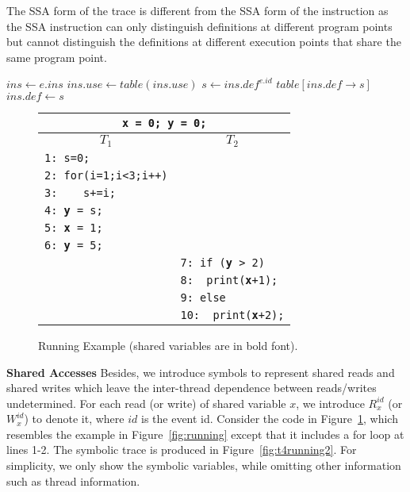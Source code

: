 The SSA form of the trace is different from the SSA form of the instruction as the SSA instruction can only distinguish definitions at different program points but cannot distinguish the definitions at different execution points that share the same program point.





\begin{algorithmic}[3]
 \State $ins\gets e.ins$ 
 \State $ins.use \gets table(ins.use)$
 \EndFor
    \State $ s\gets ins.def^{e.id}$
	\State $ table [ins.def \rightarrow s]$
	\State $ins.def\gets s$
 \EndIf
\EndFor
\end{algorithmic}


\begin{figure}
\centering
\begin{tabular}{ll}
\multicolumn{2}{c}{{\tt {\bf x} = 0; {\bf y} = 0;}} \\
\hline
\multicolumn{1}{c}{$T_1$} & \multicolumn{1}{c}{$T_2$} \\
\hline
{\tt 1: s=0; } & \\
{\tt 2: for(i=1;i<3;i++)} & \\
{\tt 3: \ \ \ s+=i;} & \\
{\tt 4: {\bf y} = s;} & \\
{\tt 5: {\bf x} = 1;} & \\
{\tt 6: {\bf y} = 5;} & \\
& {\tt 7: if ({\bf y} > 2)} \\
& {\tt 8:~~print({\bf x}+1);} \\	
& {\color{Gray} {\tt 9: else}} \\
& {\color{Gray} {\tt 10:~~print({\bf x}+2);}}
\end{tabular}
\caption{Running Example (shared variables are in bold font). }
\label{fig:running2}
\end{figure}



{\bf Shared Accesses}   Besides, we introduce symbols to represent shared reads and shared writes which leave the inter-thread dependence between reads/writes undetermined. For each read (or write) of shared variable $x$, we introduce $R^{id}_x$ (or $W^{id}_x$) to denote it, where $id$ is the event id.
Consider the code in Figure~\ref{fig:running2}, which resembles the example in Figure~\ref{fig:running} except that it includes a for loop at lines 1-2.
The symbolic trace is produced in Figure~\ref{fig:t4running2}. For simplicity, we only show the symbolic variables, while omitting other information such as thread information.




